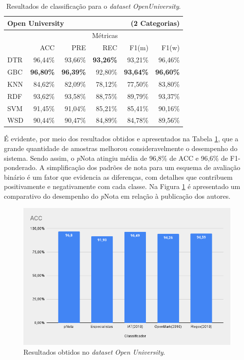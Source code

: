 \begin{table}
\centering
\caption{Resultados de classificação para o \textit{dataset OpenUniversity}.}
\label{tab-OU}
\begin{tabular}{l r r r r r}
    \hline
    \multicolumn{4}{l}{\textbf{Open University}} &  \multicolumn{2}{r}{(2 Categorias)} \\ \hline
     & \multicolumn{5}{c}{M{\'e}tricas} \\ \cline{2-6}

     & ACC & PRE & REC & F1(m) & F1(w) \\ \cline{2-6}
    DTR & 96,44\% & 93,66\% & \textbf{93,26\%} & 93,21\% & 96,46\% \\
    GBC & \textbf{96,80\%} & \textbf{96,39\%} & 92,80\% & \textbf{93,64\%} & \textbf{96,60\%} \\
    KNN & 84,62\% & 82,09\% & 78,12\% & 77,50\% & 83,80\% \\
    RDF & 93,62\% & 93,58\% & 88,75\% & 89,79\% & 93,37\% \\
    SVM & 91,45\% & 91,04\% & 85,21\% & 85,41\% & 90,16\% \\
    WSD & 90,44\% & 90,47\% & 84,89\% & 84,78\% & 89,56\% \\

    \hline
    \hline
\end{tabular}
\end{table}

É evidente, por meio dos resultados obtidos e apresentados na Tabela \ref{tab-OU}, que a grande quantidade de amostras melhorou consideravelmente o desempenho do sistema. Sendo assim, o \textit{p}Nota atingiu média de 96,8\% de ACC e 96,6\% de F1-ponderado. A simplificação dos padrões de nota para um esquema de avaliação binário é um fator que evidencia as diferenças, com detalhes que contribuem positivamente e negativamente com cada classe. Na Figura \ref{fig-OU} é apresentado um comparativo do desempenho do \textit{p}Nota em relação à publicação dos autores.

\begin{figure}[!h]
\centering
\includegraphics[width=.6\textwidth]{figuras/OU/res-ou-acc.png}
\caption{Resultados obtidos no \textit{dataset} \textit{Open University}.}
\label{fig-OU}
\end{figure}

